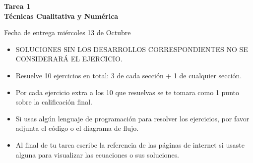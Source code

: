 \documentclass[12pt]{exam}
\begin{document}
\centering


\Large 
\textbf{\huge Tarea 1\\ \large Técnicas Cualitativa y Numérica}

\small
Fecha de entrega miércoles 13 de Octubre
\vskip10pt

\normalsize
\begin{tcolorbox}
\begin{itemize}
    \item SOLUCIONES SIN LOS DESARROLLOS CORRESPONDIENTES NO SE CONSIDERARÁ EL EJERCICIO.
    \item Resuelve 10 ejercicios en total: 3 de cada sección + 1 de cualquier sección.
    \item Por cada ejercicio extra a los 10 que resuelvas se te tomara como 1 punto sobre la calificación final.
    \item Si usas algún lenguaje de programación para resolver los ejercicios, por favor adjunta el código o el diagrama de flujo.
    \item Al final de tu tarea escribe la referencia de las páginas de internet si usaste alguna para visualizar las ecuaciones o sus soluciones.
\end{itemize}


\end{tcolorbox}
\pointformat{\bfseries\boldmath(\thepoints)}
\vskip10pt
\end{document}
